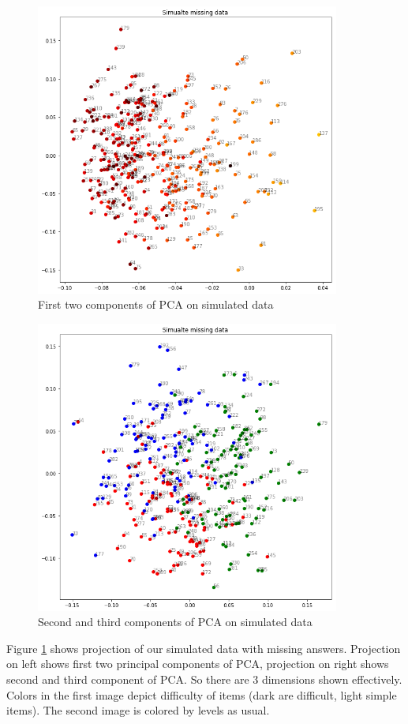 \documentclass[
  digital, %
  table,   %
  nolof,     %
  nolot,     %
  nocover
]{fithesis3}
\begin{document}
\begin{figure}
  \includegraphics[width=10cm]{img/simulated_missing_D12}
  \caption{First two components of PCA on simulated data}
  \label{fig:simulated_missing_d12}
\end{figure}

\begin{figure}
  \includegraphics[width=10cm]{img/simulated_missing_D23}
  \caption{Second and third components of PCA on simulated data}
  \label{fig:simulated_missing_d23}
\end{figure}

Figure \ref{fig:simulated_missing_d12} shows projection of our simulated data with missing answers. Projection on left shows first two principal components of PCA, projection on right shows second and third component of PCA. So there are 3 dimensions shown effectively. Colors in the first image depict difficulty of items (dark are difficult, light simple items). The second image is colored by levels as usual.
\end{document}
